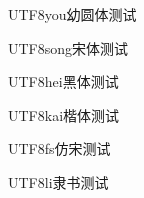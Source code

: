 \documentclass{article}
\begin{document}
\begin{CJK}{UTF8}{you}幼圆体测试\end{CJK}

\begin{CJK}{UTF8}{song}宋体测试\end{CJK}

\begin{CJK}{UTF8}{hei}黑体测试\end{CJK}

\begin{CJK}{UTF8}{kai}楷体测试\end{CJK}

\begin{CJK}{UTF8}{fs}仿宋测试\end{CJK}

\begin{CJK}{UTF8}{li}隶书测试\end{CJK}
\end{document}
